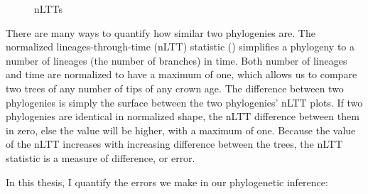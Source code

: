\begin{figure}[H]
  \centering
  \caption{
    nLTTs
  }
  \label{fig:nltts}
\end{figure}

There are many ways to quantify how similar two phylogenies are. 
The normalized lineages-through-time (nLTT) statistic (\cite{janzen2015approximate}) simplifies
a phylogeny to a number of lineages (the number of branches) in time.
Both number of lineages and time are normalized to have a maximum of one,
which allows us to compare two trees of any number of tips of any crown age.
The difference between two phylogenies is simply the surface between the
two phylogenies' nLTT plots. If two phylogenies are identical in 
normalized shape, the nLTT difference between them in zero, else the
value will be higher, with a maximum of one. Because the value of the 
nLTT increases with increasing difference between the trees, the nLTT statistic
is a measure of difference, or error. 

In this thesis, I quantify the errors we make in our phylogenetic inference:

